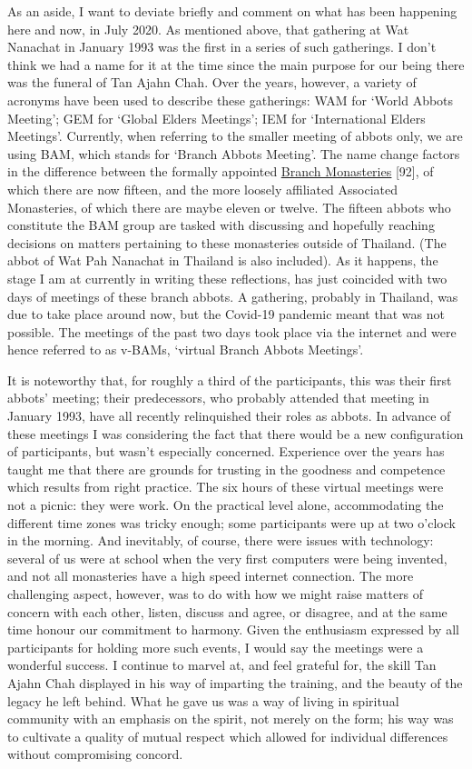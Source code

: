 As an aside, I want to deviate briefly and comment on what has been
happening here and now, in July 2020. As mentioned above, that gathering
at Wat Nanachat in January 1993 was the first in a series of such
gatherings. I don't think we had a name for it at the time since the
main purpose for our being there was the funeral of Tan Ajahn Chah. Over
the years, however, a variety of acronyms have been used to describe
these gatherings: WAM for `World Abbots Meeting'; GEM for `Global Elders
Meetings'; IEM for `International Elders Meetings'. Currently, when
referring to the smaller meeting of abbots only, we are using BAM, which
stands for `Branch Abbots Meeting'. The name change factors in the
difference between the formally appointed
\href{https://forestsangha.org/}{\underline{Branch Monasteries}}
{[}92{]}, of which there are now fifteen, and the more loosely
affiliated Associated Monasteries, of which there are maybe eleven or
twelve. The fifteen abbots who constitute the BAM group are tasked with
discussing and hopefully reaching decisions on matters pertaining to
these monasteries outside of Thailand. (The abbot of Wat Pah Nanachat in
Thailand is also included). As it happens, the stage I am at currently
in writing these reflections, has just coincided with two days of
meetings of these branch abbots. A gathering, probably in Thailand, was
due to take place around now, but the Covid-19 pandemic meant that was
not possible. The meetings of the past two days took place via the
internet and were hence referred to as v-BAMs, `virtual Branch Abbots
Meetings'.

It is noteworthy that, for roughly a third of the participants, this was
their first abbots' meeting; their predecessors, who probably attended
that meeting in January 1993, have all recently relinquished their roles
as abbots. In advance of these meetings I was considering the fact that
there would be a new configuration of participants, but wasn't
especially concerned. Experience over the years has taught me that there
are grounds for trusting in the goodness and competence which results
from right practice. The six hours of these virtual meetings were not a
picnic: they were work. On the practical level alone, accommodating the
different time zones was tricky enough; some participants were up at two
o'clock in the morning. And inevitably, of course, there were issues
with technology: several of us were at school when the very first
computers were being invented, and not all monasteries have a high speed
internet connection. The more challenging aspect, however, was to do
with how we might raise matters of concern with each other, listen,
discuss and agree, or disagree, and at the same time honour our
commitment to harmony. Given the enthusiasm expressed by all
participants for holding more such events, I would say the meetings were
a wonderful success. I continue to marvel at, and feel grateful for, the
skill Tan Ajahn Chah displayed in his way of imparting the training, and
the beauty of the legacy he left behind. What he gave us was a way of
living in spiritual community with an emphasis on the spirit, not merely
on the form; his way was to cultivate a quality of mutual respect which
allowed for individual differences without compromising concord.

